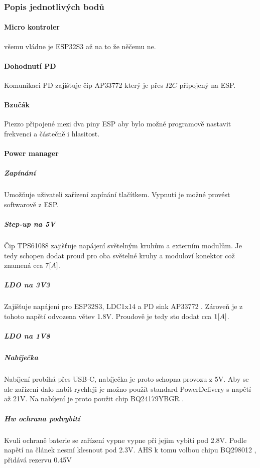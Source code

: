 \subsubsection{Popis jednotlivých bodů}
\paragraph{Micro kontroler}
všemu vládne je ESP32S3 \cite{ESP32S3-WR} až na to že něčemu ne.

\paragraph{Dohodnutí PD}
Komunikaci PD zajišťuje čip AP33772 \cite{AP33772} který je přes \(I2C\) připojený na ESP.

\paragraph{Bzučák}
Piezzo připojené mezi dva piny ESP aby bylo možné programově nastavit frekvenci a částečně i hlasitost.

\paragraph{Power manager}
\subparagraph{Zapínání}
Umožňuje uživateli zařízení zapínání tlačítkem.
Vypnutí je možné provést softwarově z ESP.

\subparagraph{Step-up na 5V}
Čip TPS61088 \cite{TPS61088} zajišťuje napájení světelným kruhům a externím modulům.
Je tedy schopen dodat proud pro oba světelné kruhy a moduloví konektor což znamená cca \(7\-[A]\).

\subparagraph{LDO na 3V3}
Zajišťuje napájení pro ESP32S3, LDC1x14 a PD sink AP33772 \cite{AP33772}.
Zároveň je z tohoto napětí odvozena větev 1.8V.
Proudově je tedy sto dodat cca \(1\-[A]\).

\subparagraph{LDO na 1V8}


\subparagraph{Nabíječka}
Nabíjení probíhá přes USB-C, nabíječka je proto schopna provozu z 5V.
Aby se ale zařízení dalo nabít rychleji je možno použít standard PowerDelivery s napětí až 21V.
Na nabíjení je proto použit chip BQ24179YBGR \cite{BQ24179}.

\subparagraph{Hw ochrana podvybití}
Kvuli ochraně baterie se zařízení vypne vypne při jejim vybití pod 2.8V.
Podle \cite{PanasonicLiOntReport} napětí na článek nesmí klesnout pod 2.3V. 
AHS k tomu volbou chipu BQ298012 \cite{BQ298012}, přidává rezervu 0.45V 



